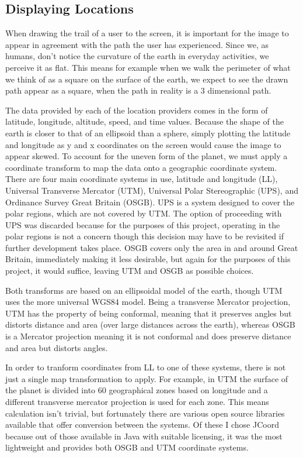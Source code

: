 \subsection{Displaying Locations}
When drawing the trail of a user to the screen, it is important for the image to appear in agreement with the path the user has experienced. Since we, as humans, don't notice the curvature of the earth in everyday activities, we perceive it as flat. This means for example when we walk the perimeter of what we think of as a square on the surface of the earth, we expect to see the drawn path appear as a square, when the path in reality is a 3 dimensional path.

The data provided by each of the location providers comes in the form of latitude, longitude, altitude, speed, and time values. Because the shape of the earth is closer to that of an ellipsoid than a sphere, simply plotting the latitude and longitude as y and x coordinates on the screen would cause the image to appear skewed. To account for the uneven form of the planet, we must apply a coordinate transform to map the data onto a geographic coordinate system. There are four main coordinate systems in use, latitude and longitude (LL), Universal Transverse Mercator (UTM), Universal Polar Stereographic (UPS), and Ordinance Survey Great Britain (OSGB). UPS is a system designed to cover the polar regions, which are not covered by UTM. The option of proceeding with UPS was discarded because for the purposes of this project, operating in the polar regions is not a concern though this decision may have to be revisited if further development takes place. OSGB covers only the area in and around Great Britain, immediately making it less desirable, but again for the purposes of this project, it would suffice, leaving UTM and OSGB as possible choices.

Both transforms are based on an ellipsoidal model of the earth, though UTM uses the more universal WGS84 model. Being a transverse Mercator projection, UTM has the property of being conformal, meaning that it preserves angles but distorts distance and area (over large distances across the earth), whereas OSGB is a Mercator projection meaning it is not conformal and does preserve distance and area but distorts angles.\cite{UTM}

In order to tranform coordinates from LL to one of these systems, there is not just a single map transformation to apply. For example, in UTM the surface of the planet is divided into 60 geographical zones based on longitude and a different transverse mercator projection is used for each zone. This means calculation isn't trivial, but fortunately there are various open source libraries available that offer conversion between the systems. Of these I chose JCoord because out of those available in Java with suitable licensing, it was the most lightweight and provides both OSGB and UTM coordinate systems.\cite{JCoord}

